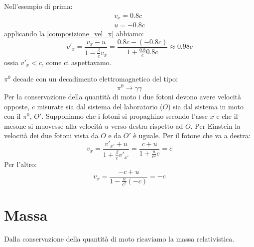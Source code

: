 \begin{Es}
Nell'esempio di prima:
\[\begin{array}{ll}
   v_x = 0.8 c\\
   u = - 0.8 c
  \end{array}
\]
applicando la \ref{composizione_vel_x} abbiamo:
\[v'_x=\frac{v_x - u}{1-\frac{\beta}{c}v_x}=\frac{0.8c - (- 0.8c)}{1+\frac{0.8}{c}0.8c} \approx 0.98c\]
ossia $v'_x < c$, come ci aspettavamo.
\end{Es}

\begin{Es}[decadimento $\pi^0$]
$\pi^0$ decade con un decadimento elettromagnetico del tipo:
\[\pi^0\rightarrow \gamma\gamma\]
Per la conservazione della quantità di moto i due fotoni devono avere velocità opposte, $c$ misurate sia dal sistema del laboratorio ($O$) sia dal sistema in moto con il $\pi^0$, $O'$. Supponiamo che i fotoni si propaghino secondo l'asse $x$ e che il mesone si muovesse alla velocità $u$ verso destra rispetto ad $O$. Per Einstein la velocità dei due fotoni vista da $O$ e da $O'$ è uguale.
Per il fotone che va a destra:
\[v_x=\frac{v'_{x'}+u}{1+\frac{\beta}{c}v'_{x'}}=\frac{c+u}{1+\frac{u}{c^2}c}=c\]
Per l'altro:
\[v_x=\frac{-c+u}{1-\frac{u}{c^2}(-c)}=-c\]
\end{Es}

\section{Massa}
Dalla conservazione della quantità di moto ricaviamo la massa relativistica.

